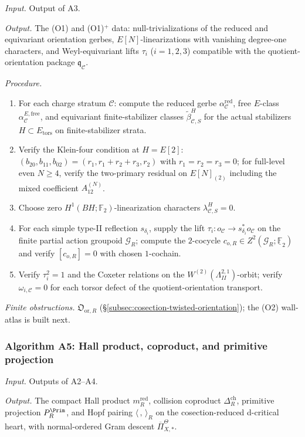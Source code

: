 \textit{Input.} Output of A3.

\textit{Output.} The (O1) and (O1)$^+$ data: null-trivializations of
the reduced and equivariant orientation gerbes,
$E[N]$-linearizations with vanishing degree-one characters, and
Weyl-equivariant lifts $\tau_i$ ($i=1,2,3$) compatible with the
quotient-orientation package $\mathfrak q_{\mathcal C}$.

\textit{Procedure.}
\begin{enumerate}
\item For each charge stratum $\mathcal C$: compute the reduced
gerbe $\alpha^{\mathrm{red}}_{\mathcal C}$, free $E$-class
$\alpha^{E,\mathrm{free}}_{\mathcal C}$, and equivariant
finite-stabilizer classes $\widetilde\beta^{H}_{\mathcal C,S}$ for
the actual stabilizers $H\subset E_{\mathrm{tors}}$ on
finite-stabilizer strata.
\item Verify the Klein-four condition at $H=E[2]$:
$(b_{20},b_{11},b_{02})=(r_1,r_1+r_2+r_3,r_2)$ with
$r_1=r_2=r_3=0$; for full-level even $N\ge 4$, verify the
two-primary residual on $E[N]_{(2)}$ including the mixed coefficient
$A_{12}^{(N)}$.
\item Choose zero $H^1(BH;\mathbb F_2)$-linearization characters
$\lambda^H_{\mathcal C,S}=0$.
\item For each simple type-II reflection $s_{\delta_i}$, supply the
lift $\tau_i:o_{\mathcal C}\to s_{\delta_i}^* o_{\mathcal C}$ on the
finite partial action groupoid $\mathcal G_R$; compute the
$2$-cocycle $c_{o,R}\in Z^2(\mathcal G_R;\underline{\mathbb F}_2)$
and verify $[c_{o,R}]=0$ with chosen $1$-cochain.
\item Verify $\tau_i^2=1$ and the Coxeter relations on the
$W^{(2)}(\Lambda_{II}^{2,1})$-orbit; verify
$\omega_{i,\mathcal C}=0$ for each torsor defect of the
quotient-orientation transport.
\end{enumerate}

\textit{Finite obstructions.}  $\mathfrak O_{\mathrm{or},R}$
(\S\ref{subsec:cosection-twisted-orientation}); the (O2) wall-atlas
is built next.

\subsubsection*{Algorithm A5: Hall product, coproduct, and primitive
projection}

\textit{Input.} Outputs of A2--A4.

\textit{Output.} The compact Hall product $m_R^{\mathrm{red}}$,
collision coproduct $\Delta_R^{\mathrm{ch}}$, primitive projection
$P_R^{\Prim}$, and Hopf pairing $\langle\,,\,\rangle_R$ on the
cosection-reduced d-critical heart, with normal-ordered Gram descent
$\overline\Pi_{X,*}^\Theta$.

